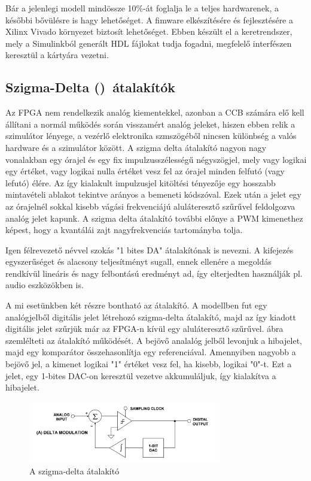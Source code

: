 Bár a jelenlegi modell mindössze 10\%-át foglalja le a teljes hardwarenek, a későbbi bővülésre is hagy lehetőséget. A fimware elkészítésére és fejlesztésére a Xilinx Vivado környezet biztosít lehetőséget. Ebben készült el a keretrendszer, mely a Simulinkból generált HDL fájlokat tudja fogadni, megfelelő interfészen keresztül a kártyára vezetni.


\subsection{Szigma-Delta (\Sigma\Delta)\ átalakítók}

Az FPGA nem rendelkezik analóg kiementekkel, azonban a CCB számára elő kell állítani a normál működés során visszamért analóg jeleket, hiszen ebben relik a szimulátor lényege, a vezérlő elektronika szmszögéből nincsen különbség a valós hardware és a szimulátor között. A szigma delta átalakító nagyon nagy vonalakban egy órajel és egy fix impulzusszélességű négyszögjel, mely vagy logikai egy értéket, vagy logikai nulla értéket vesz fel az órajel minden felfutó (vagy lefutó) élére. Az így kialakult impulzusjel kitöltési tényezője egy hosszabb mintavételi ablakot tekintve arányos a bemeneti kódszóval. Ezek után a jelet egy az órajelnél sokkal kisebb vágási frekvenciájú aluláteresztő szűrűvel feldolgozva analóg jelet kapunk. A szigma delta átalakító további előnye a PWM kimenethez képest, hogy a kvantálái zajt nagyfrekvenciás tartományba tolja.\cite{artofelectronics}

Igen félrevezető névvel szokás "1 bites DA" átalakítónak is nevezni. A kifejezés egyszerűséget és alacsony teljesítményt sugall, ennek ellenére a megoldás rendkívül lineáris és nagy felbontású eredményt ad, így elterjedten használják pl. audio eszközökben is.

A mi esetünkben két részre bontható az átalakító. A modellben fut egy analógjelből digitális jelet létrehozó szigma-delta átalakító, majd az így kiadott digitális jelet szűrjük már az FPGA-n kívül egy aluláteresztő szűrűvel.  ábra szemlélteti az átalakító működését. A bejövő analalóg jelből levonjuk a hibajelet, majd egy komparátor összehasonlítja egy referenciával. Amennyiben nagyobb a bejövő jel, a kimenet logikai "1" értéket vesz fel, ha kisebb, logikai "0"-t. Ezt a jelet, egy 1-bites DAC-on keresztül vezetve akkumuláljuk, így kialakítva a hibajelet. 

\begin{figure}[!h]
	\centering
	\includegraphics[width = 0.75\textwidth]{figures/sigmadelta.png}
	\caption{A szigma-delta átalakító} 
	\label{fig:sigmadelta}
\end{figure}

